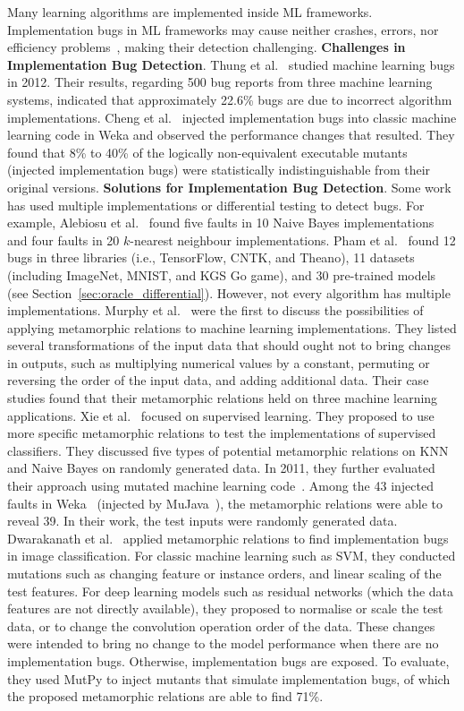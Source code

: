 \label{sec:implementationtesting}
Many learning algorithms are implemented inside ML frameworks.
Implementation bugs in ML frameworks may cause neither crashes, errors, nor efficiency problems~, making their detection challenging.
\noindent\textbf{Challenges in Implementation Bug Detection}.
Thung et al.~ studied machine learning bugs in 2012.
Their results, regarding 500 bug reports from three machine learning systems, indicated that approximately 22.6\% bugs are due to incorrect algorithm implementations.
Cheng et al.~ injected implementation bugs into classic machine learning code in Weka and observed the performance changes that resulted.
They found that 
8\% to 40\% of the logically non-equivalent executable mutants (injected implementation bugs) were statistically indistinguishable from their original versions. 
\noindent\textbf{Solutions for Implementation Bug Detection}.
Some work has used multiple implementations or differential testing to detect bugs.
For example, Alebiosu et al.~ found five faults in 10 Naive Bayes implementations and four faults in 20 $k$-nearest neighbour implementations.
Pham et al.~ found 12 bugs in three libraries (i.e., TensorFlow, CNTK, and Theano), 11 datasets (including ImageNet, MNIST, and KGS Go game), and 30 pre-trained models (see Section~\ref{sec:oracle_differential}).
However, not every algorithm has multiple implementations. Murphy et al.~ were the first to discuss the possibilities of applying metamorphic relations to machine learning implementations.
They listed several transformations of the input data that should ought not to bring changes in outputs, such as multiplying numerical values by a constant, permuting or reversing the order of the input data, and adding additional data.
Their case studies found that their metamorphic relations held on three machine learning applications.
Xie et al.~ focused on supervised learning. They proposed to use more specific metamorphic relations to test the implementations of supervised classifiers.
They discussed five types of potential metamorphic relations on KNN and Naive Bayes on randomly generated data.
In 2011, they further evaluated their approach using mutated machine learning code~.
Among the 43 injected faults in Weka~ (injected by MuJava~), the metamorphic relations were able to reveal 39.
In their work, the test inputs were randomly generated data. 
Dwarakanath et al.~ applied metamorphic relations to find implementation bugs in image classification.
For classic machine learning such as SVM, they conducted mutations such as changing feature or instance orders, and linear scaling of the test features. 
For deep learning models such as residual networks (which the data features are not directly available),
they proposed to normalise or scale the test data, or to change the convolution operation order of the data. 
These changes were intended to bring no change to the model performance when there are no implementation bugs. 
Otherwise, implementation bugs are exposed. 
To evaluate, they used MutPy to inject mutants that simulate implementation bugs, of which the proposed metamorphic relations are able to find 71\%.

